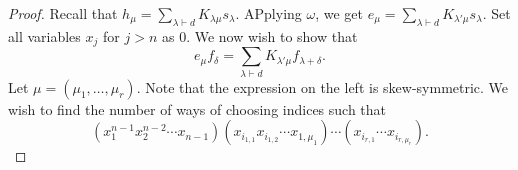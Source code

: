 	\begin{proof}
		Recall that $h_\mu = \sum_{\lambda \vdash d} K_{\lambda\mu} s_\lambda$. APplying $\omega$, we get $e_\mu = \sum_{\lambda \vdash d} K_{\lambda'\mu} s_\lambda$. Set all variables $x_j$ for $j > n$ as $0$. We now wish to show that
		\[ e_\mu f_\delta = \sum_{\lambda \vdash d} K_{\lambda'\mu} f_{\lambda+\delta}. \]
		Let $\mu = (\mu_1,\ldots,\mu_r)$. Note that the expression on the left is skew-symmetric. We wish to find the number of ways of choosing indices such that
		\[ (x_1^{n-1} x_2^{n-2} \cdots x_{n-1})(x_{i_{1,1}}x_{i_{1,2}}\cdots x_{1,\mu_1})\cdots(x_{i_{r,1}}\cdots x_{i_{r,\mu_r}}). \]





	\end{proof}
